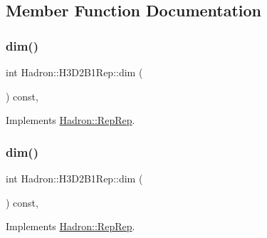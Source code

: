 \subsection{Member Function Documentation}
\mbox{\label{structHadron_1_1H3D2B1Rep_a6330bd40d22d4580286ffabbcf9f3c7d}} 
\subsubsection{\texorpdfstring{dim()}{dim()}\hspace{0.1cm}{\footnotesize\ttfamily [1/5]}}
{\footnotesize\ttfamily int Hadron\+::\+H3\+D2\+B1\+Rep\+::dim (\begin{DoxyParamCaption}{ }\end{DoxyParamCaption}) const\hspace{0.3cm}{\ttfamily [inline]}, {\ttfamily [virtual]}}



Implements \mbox{\hyperlink{structHadron_1_1RepRep_a92c8802e5ed7afd7da43ccfd5b7cd92b}{Hadron\+::\+Rep\+Rep}}.

\mbox{\label{structHadron_1_1H3D2B1Rep_a6330bd40d22d4580286ffabbcf9f3c7d}} 
\subsubsection{\texorpdfstring{dim()}{dim()}\hspace{0.1cm}{\footnotesize\ttfamily [2/5]}}
{\footnotesize\ttfamily int Hadron\+::\+H3\+D2\+B1\+Rep\+::dim (\begin{DoxyParamCaption}{ }\end{DoxyParamCaption}) const\hspace{0.3cm}{\ttfamily [inline]}, {\ttfamily [virtual]}}



Implements \mbox{\hyperlink{structHadron_1_1RepRep_a92c8802e5ed7afd7da43ccfd5b7cd92b}{Hadron\+::\+Rep\+Rep}}.

\mbox{\label{structHadron_1_1H3D2B1Rep_a6330bd40d22d4580286ffabbcf9f3c7d}} 
